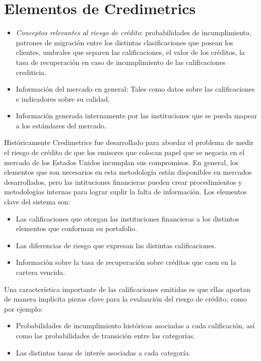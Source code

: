 \documentclass[
  12pt,
]{krantz}
\theoremstyle{definition}
\theoremstyle{definition}
\theoremstyle{definition}
\theoremstyle{remark}
\begin{document}
\hypertarget{elementos-de-credimetrics}{%
\section{\texorpdfstring{Elementos de \textbf{Credimetrics}}{Elementos de Credimetrics}}\label{elementos-de-credimetrics}}

\begin{itemize}
\item
  \emph{Conceptos relevantes al riesgo de crédito}: probabilidades de incumplimiento, patrones de migración entre los distintas clasificaciones que posean los clientes, umbrales que separen las calificaciones, el valor de los créditos, la tasa de recuperación en caso de incumplimiento de las calificaciones crediticia.
\item
  Información del mercado en general: Tales como datos sobre las calificaciones e indicadores sobre su calidad.
\item
  Información generada internamente por las instituciones que se pueda mapear a los estándares del mercado.
\end{itemize}

Históricamente Credimetrics fue desarrollado para abordar el problema de medir el riesgo de crédito de que los emisores que colocan papel que se negocia en el mercado de los Estados Unidos incumplan sus compromisos. En general, los elementos que son necesarios en esta metodología están disponibles en mercados desarrollados, pero las intituciones financieras pueden crear procedimientos y metodologías internas para lograr suplir la falta de información. Los elementos clave del sistema son:

\begin{itemize}
\item
  Las calificaciones que otorgan las instituciones financieras a los distintos elementos que conforman su portafolio.
\item
  Las diferencias de riesgo que expresan las distintas calificaciones.
\item
  Información sobre la tasa de recuperación sobre créditos que caen en la cartera vencida.
\end{itemize}

Una característica importante de las calificaciones emitidas es que ellas aportan de manera implícita piezas clave para la evaluación del riesgo de crédito, como por ejemplo:

\begin{itemize}
\item
  Probabilidades de incumplimiento históricas asociadas a cada calificación, así como las probabilidades de transición entre las categorías.
\item
  Las distintas tasas de interés asociadas a cada categoría.
\end{itemize}
\end{document}
